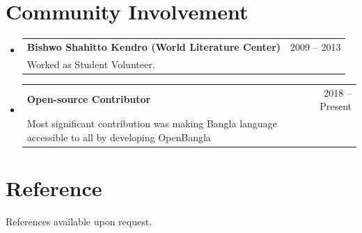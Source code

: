 \documentclass[A4,11pt]{article}
\makeatletter
\newcommand{\CVSubheading}[4]{
  \vspace{-2pt}\item
    \begin{tabular*}{0.97\textwidth}[t]{l@{\extracolsep{\fill}}r}
      \textbf{#1} & #2 \\
      \small#3 & \small #4 \\
    \end{tabular*}\vspace{-7pt}
}
\newcommand{\CVSubHeadingListStart}{\begin{itemize}[leftmargin=0.5cm, label={}]}
\newcommand{\CVSubHeadingListEnd}{\end{itemize}}
\makeatother
\begin{document}
\section{Community Involvement}
  \CVSubHeadingListStart
    \CVSubheading
      {Bishwo Shahitto Kendro (World Literature Center)}{2009 -- 2013}
      {Worked as Student Volunteer.}{}
    \CVSubheading
      {Open-source Contributor}{2018 -- Present}
      {Most significant contribution was making Bangla language accessible to all by developing OpenBangla}{}
  \CVSubHeadingListEnd



\section{Reference}
References available upon request.
    
\end{document}
